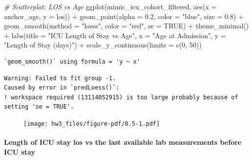 \documentclass[
]{article}
\let\oldparagraph\paragraph
\renewcommand{\paragraph}[1]{\oldparagraph{#1}\mbox{}}
\newenvironment{Shaded}{\begin{snugshade}}{\end{snugshade}}
\newcommand{\AttributeTok}[1]{\textcolor[rgb]{0.77,0.63,0.00}{#1}}
\newcommand{\CommentTok}[1]{\textcolor[rgb]{0.56,0.35,0.01}{\textit{#1}}}
\newcommand{\ConstantTok}[1]{\textcolor[rgb]{0.00,0.00,0.00}{#1}}
\newcommand{\DecValTok}[1]{\textcolor[rgb]{0.00,0.00,0.81}{#1}}
\newcommand{\FloatTok}[1]{\textcolor[rgb]{0.00,0.00,0.81}{#1}}
\newcommand{\FunctionTok}[1]{\textcolor[rgb]{0.00,0.00,0.00}{#1}}
\newcommand{\NormalTok}[1]{\textcolor[rgb]{0.00,0.00,0.00}{#1}}
\newcommand{\SpecialCharTok}[1]{\textcolor[rgb]{0.00,0.00,0.00}{#1}}
\newcommand{\StringTok}[1]{\textcolor[rgb]{0.31,0.60,0.02}{#1}}
\begin{document}
\begin{Shaded}
\begin{Highlighting}[]
\CommentTok{\# Scatterplot: LOS vs Age}
\FunctionTok{ggplot}\NormalTok{(mimic\_icu\_cohort\_filtered, }\FunctionTok{aes}\NormalTok{(}\AttributeTok{x =}\NormalTok{ anchor\_age, }\AttributeTok{y =}\NormalTok{ los)) }\SpecialCharTok{+}
  \FunctionTok{geom\_point}\NormalTok{(}\AttributeTok{alpha =} \FloatTok{0.2}\NormalTok{, }\AttributeTok{color =} \StringTok{"blue"}\NormalTok{, }\AttributeTok{size =} \FloatTok{0.8}\NormalTok{) }\SpecialCharTok{+}  
  \FunctionTok{geom\_smooth}\NormalTok{(}\AttributeTok{method =} \StringTok{"loess"}\NormalTok{, }\AttributeTok{color =} \StringTok{"red"}\NormalTok{, }\AttributeTok{se =} \ConstantTok{TRUE}\NormalTok{) }\SpecialCharTok{+}
  \FunctionTok{theme\_minimal}\NormalTok{() }\SpecialCharTok{+}
  \FunctionTok{labs}\NormalTok{(}\AttributeTok{title =} \StringTok{"ICU Length of Stay vs Age"}\NormalTok{, }\AttributeTok{x =} \StringTok{"Age at Admission"}\NormalTok{, }
       \AttributeTok{y =} \StringTok{"Length of Stay (days)"}\NormalTok{) }\SpecialCharTok{+}
  \FunctionTok{scale\_y\_continuous}\NormalTok{(}\AttributeTok{limits =} \FunctionTok{c}\NormalTok{(}\DecValTok{0}\NormalTok{, }\DecValTok{50}\NormalTok{))  }
\end{Highlighting}
\end{Shaded}

\begin{verbatim}
`geom_smooth()` using formula = 'y ~ x'
\end{verbatim}

\begin{verbatim}
Warning: Failed to fit group -1.
Caused by error in `predLoess()`:
! workspace required (13114052915) is too large probably because of setting 'se = TRUE'.
\end{verbatim}

\begin{figure}[H]

{\centering \texttt{[image: hw3\_files/figure-pdf/8.5-1.pdf]}

}

\end{figure}

\hypertarget{length-of-icu-stay-los-vs-the-last-available-lab-measurements-before-icu-stay}{%
\paragraph{Length of ICU stay los vs the last available lab measurements
before ICU
stay}\label{length-of-icu-stay-los-vs-the-last-available-lab-measurements-before-icu-stay}}
\end{document}
